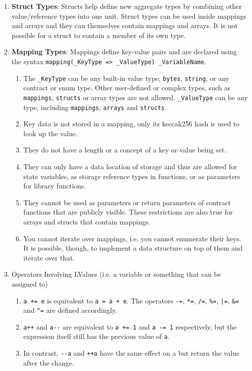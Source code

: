 \begin{enumerate}
\item\textbf{Struct Types}: Structs help define new aggregate types by combining other value/reference types into one unit. Struct types can be used inside mappings and arrays and they can themselves contain mappings and arrays. It is not possible for a struct to contain a member of its own type.

\item\textbf{Mapping Types}: Mappings define key-value pairs and are declared using the syntax \verb|mapping(_KeyType => _ValueType) _VariableName|.
    \begin{enumerate}
    \item The \verb|_KeyType| can be any built-in value type, \verb|bytes|, \verb|string|, or any contract or enum type. Other user-defined or complex types, such as \verb|mappings|, \verb|structs| or array types are not allowed. \verb|_ValueType| can be any type, including \verb|mappings|, \verb|arrays| and \verb|structs|.
    \item Key data is not stored in a mapping, only its keccak256 hash is used to look up the value.
    \item They do not have a length or a concept of a key or value being set.
    \item They can only have a data location of storage and thus are allowed for state variables, as storage reference types in functions, or as parameters for library functions.
    \item They cannot be used as parameters or return parameters of contract functions that are publicly visible. These restrictions are also true for arrays and structs that contain mappings.
    \item You cannot iterate over mappings, i.e. you cannot enumerate their keys. It is possible, though, to implement a data structure on top of them and iterate over that.
    \end{enumerate}

\item Operators Involving LValues (i.e. a variable or something that can be assigned to)
    \begin{enumerate}
    \item \verb|a += e| is equivalent to \verb|a = a + e|. The operators \verb|-=|, \verb|*=|, \verb|/=|, \verb|%=|, \verb!|=!, \verb|&=| and \verb|^=| are defined accordingly.
    \item\verb|a++| and \verb|a--| are equivalent to \verb|a += 1| and \verb|a -= 1| respectively, but the expression itself still has the previous value of \verb|a|.
    \item In contrast, \verb|--a| and \verb|++a| have the same effect on a but return the value after the change.
    \end{enumerate}


\end{enumerate}
